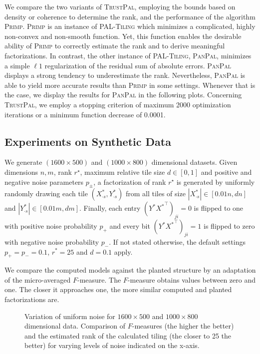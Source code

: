 We compare the two variants of \textsc{TrustPal}, employing the  bounds based on  density or coherence to determine the rank, and the performance of the algorithm \textsc{Primp}. \textsc{Primp} is an instance of \textsc{PAL-Tiling} which minimizes a complicated, highly non-convex and non-smooth function. Yet, this function enables the desirable ability of \textsc{Primp} to correctly estimate the rank and to derive meaningful factorizations. In contrast, the other instance of \textsc{PAL-Tiling}, \textsc{PanPal}, minimizes a simple $\ell1$ regularization of the residual sum of absolute errors. \textsc{PanPal} displays a strong tendency to underestimate the rank. Nevertheless, \textsc{PanPal} is able to yield more accurate results than \textsc{Primp} in some settings. Whenever that is the case, we display the results for \textsc{PanPal} in the following plots. 
Concerning \textsc{TrustPal}, we employ a stopping criterion of maximum 2000 optimization iterations or a minimum function decrease of 0.0001. 
\subsection{Experiments on Synthetic Data}
We generate $(1600\times 500)$ and $(1000\times 800)$ dimensional datasets. Given dimensions $n,m$, rank $r^\star$, maximum relative tile size $d\in[0,1]$ and positive and negative noise parameters $p_\pm$, a factorization of rank $r^\star$ is generated by uniformly randomly drawing each tile $(X^*_{\cdot s},Y^*_{\cdot s})$ from all tiles of size $|X^*_{\cdot s}|\in[0.01n,dn]$ and $|Y^*_{\cdot s}|\in[0.01m,dm]$. Finally, each entry $(Y^*{X^*}^\top)_{ji}=0$ is flipped to one with positive noise probability $p_+$ and every bit $(Y^* {X^*}^\top)_{ji}=1$ is flipped to zero with negative noise probability $p_-$. If not stated otherwise, the default settings $p_+=p_-=0.1$, $r^*=25$ and $d=0.1$ apply. 

We compare the computed models against the planted structure by an adaptation of the micro-averaged $F$-measure.
The $F$-measure obtains values between zero and one. The closer it approaches one, the more similar computed and planted factorizations are.
\begin{figure}[t]
\centering

\caption{Variation of uniform noise for $1600\times 500$ and $1000\times 800$ dimensional data. Comparison of $F$-measures (the higher the better) and the estimated rank of the calculated tiling (the closer to 25 the better) for varying levels of noise indicated on the x-axis.}
\label{fig:TP:noise}
\end{figure}

